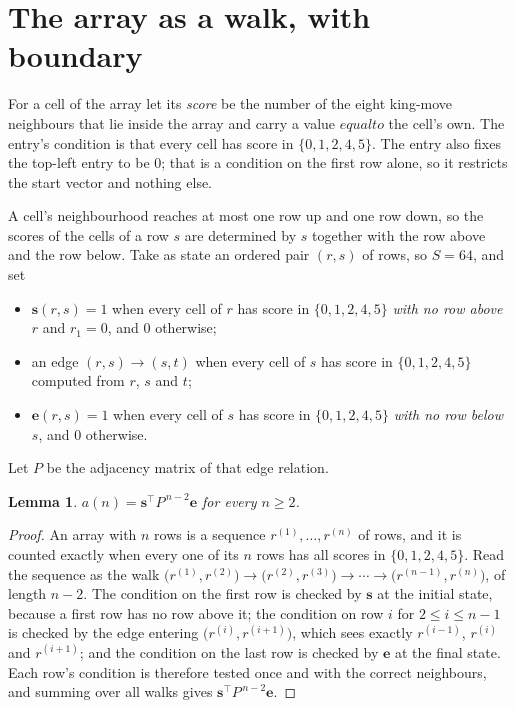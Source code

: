 \documentclass[11pt,a4paper]{article}
\theoremstyle{plain}
\newtheorem{lemma}[theorem]{Lemma}
\theoremstyle{definition}
\begin{document}
\section{The array as a walk, with boundary}

For a cell of the array let its \emph{score} be the number of the eight king-move neighbours that lie inside
the array and carry a value $equal to$ the cell's own. The entry's condition is that every cell
has score in $\{0,1,2,4,5\}$. The entry also fixes the top-left entry to be $0$; that is a condition on the first row alone, so it restricts the start vector and nothing else.

A cell's neighbourhood reaches at most one row up and one row down, so the scores of the
cells of a row $s$ are determined by $s$ together with the row above and the row below.
Take as state an ordered pair $(r,s)$ of rows, so $S=64$, and set
\begin{itemize}
\item $\mathbf{s}(r,s)=1$ when every cell of $r$ has score in $\{0,1,2,4,5\}$ \emph{with no row
above $r$} and $r_1=0$, and $0$ otherwise;
\item an edge $(r,s)\to(s,t)$ when every cell of $s$ has score in $\{0,1,2,4,5\}$ computed from
$r$, $s$ and $t$;
\item $\mathbf{e}(r,s)=1$ when every cell of $s$ has score in $\{0,1,2,4,5\}$ \emph{with no row
below $s$}, and $0$ otherwise.
\end{itemize}
Let $P$ be the adjacency matrix of that edge relation.

\begin{lemma}\label{lem:walk}
$a(n)=\mathbf{s}^{\!\top}P^{\,n-2}\mathbf{e}$ for every $n\ge2$.
\end{lemma}

\begin{proof}
An array with $n$ rows is a sequence $r^{(1)},\dots,r^{(n)}$ of rows, and it is counted
exactly when every one of its $n$ rows has all scores in $\{0,1,2,4,5\}$. Read the sequence as the
walk $\bigl(r^{(1)},r^{(2)}\bigr)\to\bigl(r^{(2)},r^{(3)}\bigr)\to\cdots\to
\bigl(r^{(n-1)},r^{(n)}\bigr)$, of length $n-2$. The condition on the first row is
checked by $\mathbf{s}$ at the initial state, because a first row has no row above it; the
condition on row $i$ for $2\le i\le n-1$ is checked by the edge entering
$\bigl(r^{(i)},r^{(i+1)}\bigr)$, which sees exactly $r^{(i-1)}$, $r^{(i)}$ and
$r^{(i+1)}$; and the condition on the last row is checked by $\mathbf{e}$ at the final
state. Each row's condition is therefore tested once and with the correct neighbours, and
summing over all walks gives $\mathbf{s}^{\!\top}P^{\,n-2}\mathbf{e}$.
\end{proof}
\end{document}
